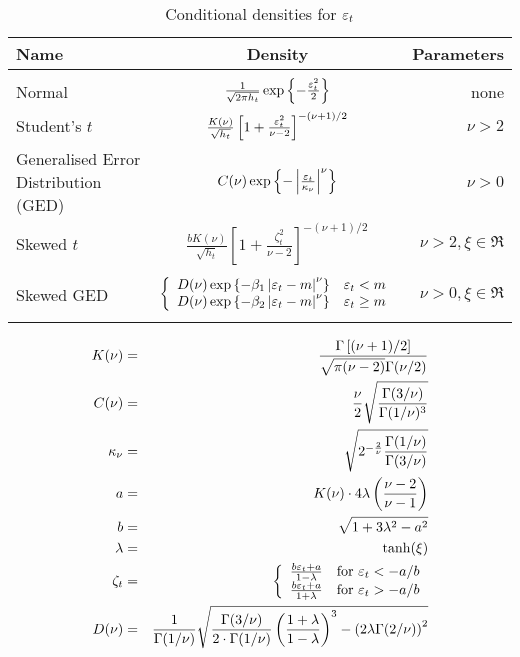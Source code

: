 \documentclass[a4paper,11pt]{article}
\newcommand{\stdu}{\ensuremath \varepsilon}
\begin{document}
\begin{table}[hptb]
  \centering
  \begin{footnotesize}
  \begin{tabular}{p{}cr}
    \hline
    \textbf{Name} &  \textbf{Density}  &  \textbf{Parameters} \\
    \hline
    \\
    Normal &
    $\frac{1}{\sqrt{2\pi h_t}}
    \exp \left\{-\frac{\stdu_t^2}{2}\right\}$ &
    none \\
    Student's $t$ &
    $\frac{K(\nu)}{\sqrt{h_t}}
    \left[1+\frac{\stdu_t^2}{\nu-2}\right]^{-(\nu + 1)/2}$ &
    $\nu > 2$ \\
    Generalised Error Distribution (GED) &
    $C(\nu)\exp\left\{-\left|\frac{\stdu_t}{\kappa_\nu}\right|^\nu\right\}$
    & $\nu > 0$ \\
    Skewed $t$ &
    $\frac{b K(\nu)}{\sqrt{h_t}}
    \left[1 + \frac{\zeta_t^2}{\nu - 2}\right]^{-(\nu + 1)/2}$
    & $\nu > 2, \xi \in \Re$ \\
    \\
    Skewed GED &
    $\left\{
      \begin{array}{cc}
        D(\nu) \exp\left\{-\beta_1 \left|\stdu_t - m\right|^\nu\right\} &
          \stdu_t < m \\
        D(\nu) \exp\left\{-\beta_2 \left|\stdu_t - m\right|^\nu\right\} &
          \stdu_t \ge m
      \end{array}
    \right.$
    & $\nu > 0, \xi \in \Re$ \\
    \\
    \hline
    \hline
  \end{tabular}
  \end{footnotesize}

\begin{eqnarray*}
  K(\nu) & = &
  \frac{\Gamma\left[(\nu + 1)/2\right]}  {\sqrt{\pi (\nu - 2)}\Gamma(\nu/2)} \\
  C(\nu) & = &
  \frac{\nu}{2}\sqrt{\frac{\Gamma(3/\nu)}{\Gamma(1/\nu)^3}} \\
  \kappa_\nu & = &
  \sqrt{2^{-\frac{2}{\nu}}\frac{\Gamma(1/\nu)}{\Gamma(3/\nu)}} \\
  a & = & K(\nu) \cdot 4 \lambda  \left( \frac{\nu - 2}{\nu - 1} \right) \\
  b & = & \sqrt{1 + 3\lambda^2 - a^2} \\
  \lambda & = & \tanh(\xi) \\
  \zeta_t & = & \left\{
    \begin{array}{ll}
        \frac{b \stdu_t + a}{1-\lambda} & \mathrm{for\ } \stdu_t < -a/b \\
        \frac{b \stdu_t + a}{1+\lambda} & \mathrm{for\ } \stdu_t > -a/b
      \end{array}
      \right. \\
  D(\nu) & = &
  \frac{1}{\Gamma(1/\nu)}\sqrt{\frac{\Gamma(3/\nu)}{2 \cdot \Gamma(1/\nu)}
  \left(\frac{1 + \lambda}{1 - \lambda}\right)^3 -
  \left(2 \lambda \Gamma(2/\nu)\right)^2 }
\end{eqnarray*}
  \caption{Conditional densities for $\stdu_t$}
  \label{tab:densities}
\end{table}
\end{document}
